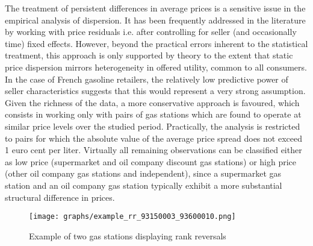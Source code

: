 \documentclass[english]{article}
\begin{document}
The treatment of persistent differences in average prices is a sensitive issue in the empirical analysis of dispersion. It has been frequently addressed in the literature by working with price residuals i.e. after controlling for seller (and occasionally time) fixed effects. However, beyond the practical errors inherent to the statistical treatment, this approach is only supported by theory to the extent that static price dispersion mirrors heterogeneity in offered utility, common to all consumers. In the case of French gasoline retailers, the relatively low predictive power of seller characteristics suggests that this would represent a very strong assumption. Given the richness of the data, a more conservative approach is favoured, which consists in working only with pairs of gas stations which are found to operate at similar price levels over the studied period.  Practically, the analysis is restricted to pairs for which the absolute value of the average price spread does not exceed 1 euro cent per liter. Virtually all remaining observations can be classified either as low price (supermarket and oil company discount gas stations) or high price (other oil company gas stations and independent), since a supermarket gas station and an oil company gas station typically exhibit a more substantial structural difference in prices.

\begin{figure}[htb!]
    \caption{Example of two gas stations displaying rank reversals}
	\centering
		\texttt{[image: graphs/example\_rr\_93150003\_93600010.png]}
\label{fig:rr_pair_example}
\end{figure}
\end{document}
